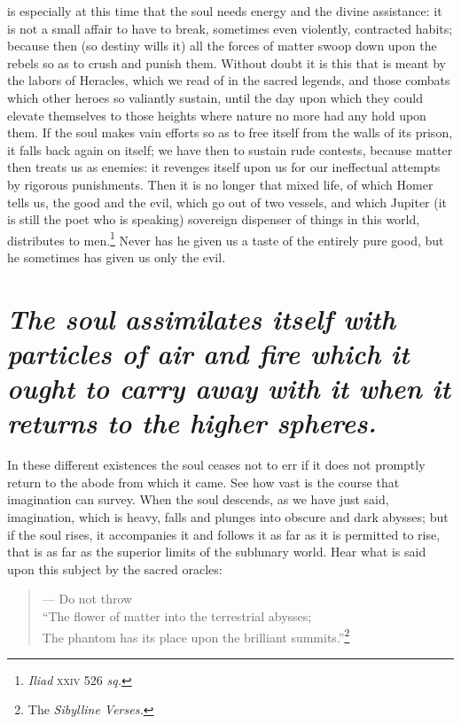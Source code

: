 \documentclass[12pt]{article}
\begin{document}
is especially at this time that the soul needs energy and the divine
assistance: it is not a small affair to have to break, sometimes even
violently, contracted habits; because then (so destiny wills it) all the forces
of matter swoop down upon the rebels so as to crush and punish them. Without
doubt it is this that is meant by the labors of Heracles, which we read of in
the sacred legends, and those combats which other heroes so valiantly sustain,
until the day upon which they could elevate themselves to those heights where
nature no more had any hold upon them. If the soul makes vain efforts so as to
free itself from the walls of its prison, it falls back again on itself; we
have then to sustain rude contests, because matter then treats us as enemies:
it revenges itself upon us for our ineffectual attempts by rigorous
punishments. Then it is no longer that mixed life, of which Homer tells us, the
good and the evil, which go out of two vessels, and which Jupiter (it is still
the poet who is speaking) sovereign dispenser of things in this world,
distributes to men.\footnote{\textit{Iliad} \textsc{xxiv} 526 \textit{sq.}}
Never has he given us a taste of the entirely pure good, but he sometimes has
given us only the evil.


\section{\mdseries\itshape The soul assimilates itself with particles of air
and fire which it ought to carry away with it when it returns to the higher
spheres.}

In these different existences the soul ceases not to err if it does not
promptly return to the abode from which it came. See how vast is the course
that imagination can survey. When the soul descends, as we have just said,
imagination, which is heavy, falls and plunges into obscure and dark abysses;
but if the soul rises, it accompanies it and follows it as far as it is
permitted to rise, that is as far as the superior limits of the sublunary
world. Hear what is said upon this subject by the sacred oracles:

\begin{verse}
--- Do not throw\\
``The flower of matter into the terrestrial abysses;\\
The phantom has its place upon the brilliant
summits.''\footnote{The \textit{Sibylline Verses.}}
\end{verse}
\end{document}
